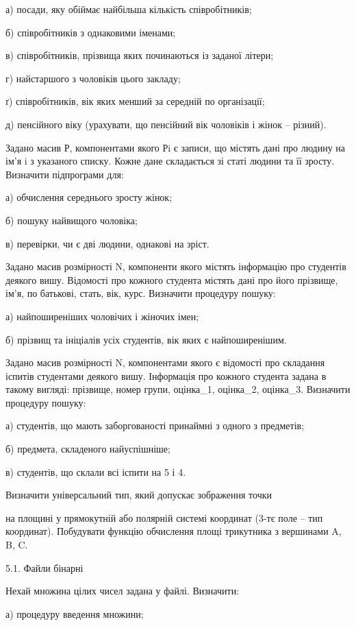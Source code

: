 \documentclass[]{article}
\begin{document}
а) посади, яку обіймає найбільша кількість співробітників;

б) співробітників з однаковими іменами;

в) співробітників, прізвища яких починаються із заданої літери;

г) найстаршого з чоловіків цього закладу;

ґ) співробітників, вік яких менший за середній по організації;

д) пенсійного віку (урахувати, що пенсійний вік чоловіків і жінок --
різний).

Задано масив Р, компонентами якого Рi є записи, що містять дані про
людину на ім'я i з указаного списку. Кожне дане складається зі статі
людини та її зросту. Визначити підпрограми для:

а) обчислення середнього зросту жінок;

б) пошуку найвищого чоловіка;

в) перевірки, чи є дві людини, однакові на зріст.

Задано масив розмірності N, компоненти якого містять інформацію про
студентів деякого вишу. Відомості про кожного студента містять дані про
його прізвище, ім'я, по батькові, стать, вік, курс. Визначити процедуру
пошуку:

а) найпоширеніших чоловічих і жіночих імен;

б) прізвищ та ініціалів усіх студентів, вік яких є найпоширенішим.

Задано масив розмірності N, компонентами якого є відомості про складання
іспитів студентами деякого вишу. Інформація про кожного студента задана
в такому вигляді: прізвище, номер групи, оцінка\_1, оцінка\_2,
оцінка\_3. Визначити процедуру пошуку:

а) студентів, що мають заборгованості принаймні з одного з предметів;

б) предмета, складеного найуспішніше;

в) студентів, що склали всі іспити на 5 і 4.

Визначити універсальний тип, який допускає зображення точки

на площині у прямокутній або полярній системі координат (3-тє поле --
тип координат). Побудувати функцію обчислення площі трикутника з
вершинами A, B, C.

5.1. Файли бінарні

Нехай множина цілих чисел задана у файлі. Визначити:

а) процедуру введення множини;
\end{document}
